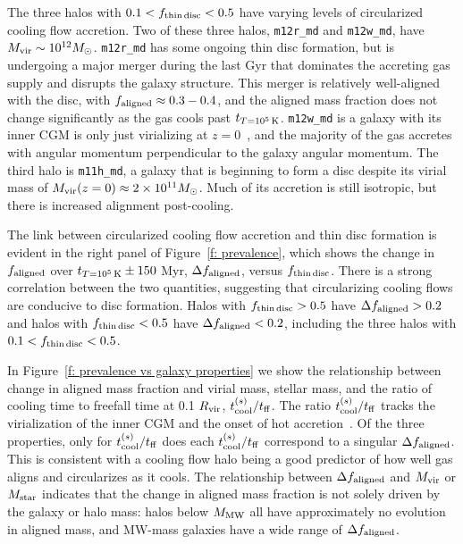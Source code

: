 \documentclass[fleqn,usenatbib]{mnras}
\newcommand{\tcon}{t_{T=10^5\,{\rm K}}}
\begin{document}
The three halos with $0.1 < f_{\rm thin\,disc} < 0.5$ have varying levels of circularized cooling flow accretion.
Two of these three halos, \texttt{m12r\_md} and \texttt{m12w\_md}, have $M_{\rm vir} \sim 10^{12} M_\odot$.
\texttt{m12r\_md} has some ongoing thin disc formation, but is undergoing a major merger during the last Gyr that dominates the accreting gas supply and disrupts the galaxy structure.
This merger is relatively well-aligned with the disc, with $f_{\rm aligned} \approx 0.3-0.4$, and the aligned mass fraction does not change significantly as the gas cools past $\tcon$.
\texttt{m12w\_md} is a galaxy with its inner CGM is only just virializing at $z=0$~\citep{Yu2021}, and the majority of the gas accretes with angular momentum perpendicular to the galaxy angular momentum.
The third halo is \texttt{m11h\_md}, a galaxy that is beginning to form a disc despite its virial mass of $M_{\rm vir}(z=0) \approx 2 \times 10^{11} M_\odot$.
Much of its accretion is still isotropic, but there is increased alignment post-cooling.

The link between circularized cooling flow accretion and thin disc formation is evident in the right panel of Figure~\ref{f: prevalence}, which shows the change in $f_{\rm aligned}$ over $\tcon \pm 150$ Myr, $\Delta f_{\rm aligned}$, versus $f_{\rm thin\,disc}$.
There is a strong correlation between the two quantities, suggesting that circularizing cooling flows are conducive to disc formation. 
Halos with $f_{\rm thin\,disc} > 0.5$ have $\Delta f_{\rm aligned} > 0.2$ and halos with $f_{\rm thin\,disc} < 0.5$ have $\Delta f_{\rm aligned} < 0.2$, including the three halos with $0.1 < f_{\rm thin\,disc} < 0.5$.

In Figure~\ref{f: prevalence vs galaxy properties} we show the relationship between change in aligned mass fraction and virial mass, stellar mass, and the ratio of cooling time to freefall time at 0.1 $R_{\rm vir}$, $t_{\rm cool}^{(s)} / t_{\rm ff}$.
The ratio $t_{\rm cool}^{(s)} / t_{\rm ff}$ tracks the virialization of the inner CGM and the onset of hot accretion~\citep{Stern2020}.
Of the three properties, only for $t_{\rm cool}^{(s)} / t_{\rm ff}$ does each $t_{\rm cool}^{(s)} / t_{\rm ff}$ correspond to a singular $\Delta f_{\rm aligned}$.
This is consistent with a cooling flow halo being a good predictor of how well gas aligns and circularizes as it cools.
The relationship between $\Delta f_{\rm aligned}$ and $M_{\rm vir}$ or $M_{\rm star}$ indicates that the change in aligned mass fraction is not solely driven by the galaxy or halo mass:
halos below $M_{\rm MW}$ all have approximately no evolution in aligned mass, and MW-mass galaxies have a wide range of $\Delta f_{\rm aligned}$.
\end{document}
